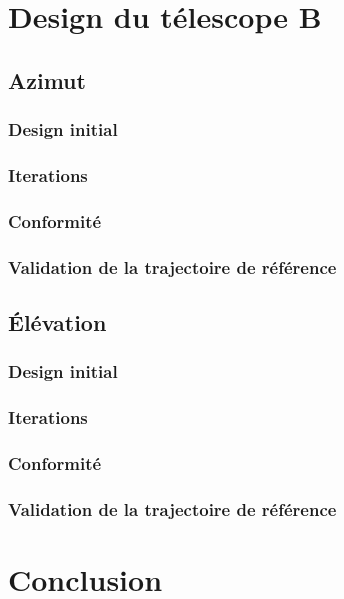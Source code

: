 \documentclass{udes_rapport} %
\begin{document}
\section{Design du télescope B}
\subsection{Azimut}
\subsubsection{Design initial}
\subsubsection{Iterations}

\subsubsection{Conformité}
\subsubsection{Validation de la trajectoire de référence}
\subsection{Élévation}
\subsubsection{Design initial}
\subsubsection{Iterations}

\subsubsection{Conformité}
\subsubsection{Validation de la trajectoire de référence}
\section{Conclusion}
\end{document}
